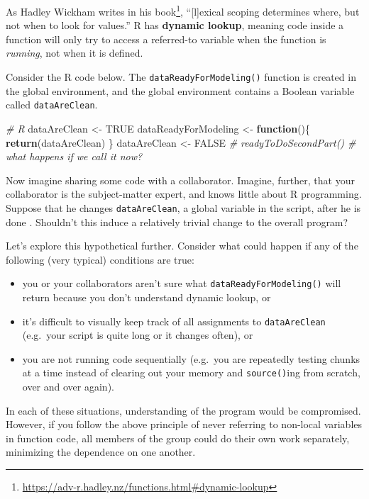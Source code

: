 \documentclass[12pt,krantz2]{krantz}
\makeatletter
\newenvironment{Shaded}{\begin{snugshade}}{\end{snugshade}}
\newcommand{\CommentTok}[1]{\textcolor[rgb]{0.37,0.37,0.37}{\textit{#1}}}
\newcommand{\ControlFlowTok}[1]{\textcolor[rgb]{0.27,0.27,0.27}{\textbf{#1}}}
\newcommand{\KeywordTok}[1]{\textcolor[rgb]{0.27,0.27,0.27}{\textbf{#1}}}
\newcommand{\NormalTok}[1]{#1}
\newcommand{\OtherTok}[1]{\textcolor[rgb]{0.37,0.37,0.37}{#1}}
\newcommand{\StringTok}[1]{\textcolor[rgb]{0.5,0.5,0.5}{#1}}
\providecommand{\tightlist}{%
  \setlength{\itemsep}{0pt}\setlength{\parskip}{0pt}}
\renewcommand{\href}[2]{#2\footnote{\url{#1}}}
\newenvironment{kframe}{%
\medskip{}
\setlength{\fboxsep}{.8em}
 \def\at@end@of@kframe{}%
 \ifinner\ifhmode%
  \def\at@end@of@kframe{\end{minipage}}%
  \begin{minipage}{\columnwidth}%
 \fi\fi%
 \def\FrameCommand##1{\hskip\@totalleftmargin \hskip-\fboxsep
 \colorbox{shadecolor}{##1}\hskip-\fboxsep
     \hskip-\linewidth \hskip-\@totalleftmargin \hskip\columnwidth}%
 \MakeFramed {\advance\hsize-\width
   \@totalleftmargin\z@ \linewidth\hsize
   \@setminipage}}%
 {\par\unskip\endMakeFramed%
 \at@end@of@kframe}
\renewenvironment{Shaded}{\begin{kframe}}{\end{kframe}}
\makeatother
\begin{document}
As Hadley Wickham writes in \href{https://adv-r.hadley.nz/functions.html\#dynamic-lookup}{his book}, ``{[}l{]}exical scoping determines where, but not when to look for values.'' R has \textbf{dynamic lookup}, meaning code inside a function will only try to access a referred-to variable when the function is \emph{running}, not when it is defined.

Consider the R code below. The \texttt{dataReadyForModeling()} function is created in the global environment, and the global environment contains a Boolean variable called \texttt{dataAreClean}.

\begin{Shaded}
\begin{Highlighting}[]
\CommentTok{# R}
\NormalTok{dataAreClean <-}\StringTok{ }\OtherTok{TRUE}
\NormalTok{dataReadyForModeling <-}\StringTok{ }\ControlFlowTok{function}\NormalTok{()\{}
  \KeywordTok{return}\NormalTok{(dataAreClean)}
\NormalTok{\}}
\NormalTok{dataAreClean <-}\StringTok{ }\OtherTok{FALSE}
\CommentTok{# readyToDoSecondPart() # what happens if we call it now?}
\end{Highlighting}
\end{Shaded}

Now imagine sharing some code with a collaborator. Imagine, further, that your collaborator is the subject-matter expert, and knows little about R programming. Suppose that he changes \texttt{dataAreClean}, a global variable in the script, after he is done . Shouldn't this induce a relatively trivial change to the overall program?

Let's explore this hypothetical further. Consider what could happen if any of the following (very typical) conditions are true:

\begin{itemize}
\tightlist
\item
  you or your collaborators aren't sure what \texttt{dataReadyForModeling()} will return because you don't understand dynamic lookup, or
\item
  it's difficult to visually keep track of all assignments to \texttt{dataAreClean} (e.g.~your script is quite long or it changes often), or
\item
  you are not running code sequentially (e.g.~you are repeatedly testing chunks at a time instead of clearing out your memory and \texttt{source()}ing from scratch, over and over again).
\end{itemize}

In each of these situations, understanding of the program would be compromised. However, if you follow the above principle of never referring to non-local variables in function code, all members of the group could do their own work separately, minimizing the dependence on one another.
\end{document}
